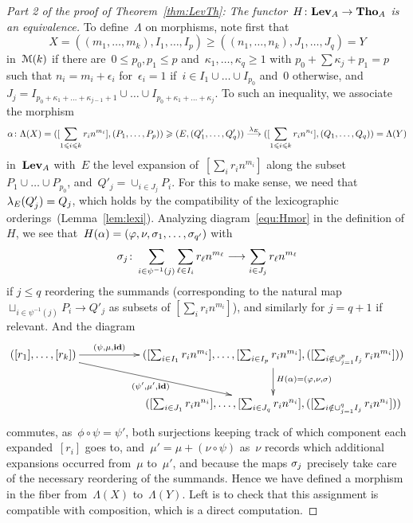 \begin{proof}[Part 2 of the proof of Theorem~\ref{thm:LevTh}: The functor~$H\colon\mathbf{Lev}_A\to \mathbf{Tho}_A$ is an equivalence]
To define~$\Lambda$ on morphisms, note first that 
\[
X=((m_1,\dots,m_k),I_1,\dots,I_p)\ge ((n_1,\dots,n_k),J_1,\dots,J_q)=Y
\]
in~$\mathcal{M}(k)$ if there are~$0\le p_0,p_1\le p$ and~$\kappa_1,\dots,\kappa_q\ge 1$ with 
$p_0+\sum \kappa_j+p_1=p$ such that  
$n_i=m_i+\epsilon_i$ for~$\epsilon_i=1$ if~$i\in I_1\cup\dots\cup I_{p_0}$ and~$0$ otherwise, and~$J_j=I_{p_0+\kappa_1+\dots+\kappa_{j-1}+1}\cup\dots\cup I_{p_0+\kappa_1+\dots+\kappa_{j}}$. 
To such an inequality, we associate the morphism 
$$\alpha\colon\Lambda(X)=([\sum_{1\leqslant i\leqslant k}r_in^{m_i}],(P_1,\dots,P_p)) \geqslant (E,(Q_1',\dots,Q_q')) \stackrel{\lambda_E}{\longrightarrow} ([\sum_{1\leqslant i\leqslant k}r_in^{n_i}],(Q_1,\dots,Q_q))=\Lambda(Y)$$
 in~$\mathbf{Lev}_A$ with~$E$ the level expansion of~$[\sum_ir_in^{m_i}]$ along the subset~$P_1\cup\dots\cup P_{p_0}$, and~$Q'_j=\cup_{i\in J_j}P_i$. 
For this to make sense, we need that $\lambda_E(Q'_j)=Q_j$, which holds by the compatibility of the lexicographic orderings~(Lemma~\ref{lem:lexi}). 
Analyzing diagram~\eqref{equ:Hmor} in the definition of $H$, we see that~\hbox{$H(\alpha)=(\varphi,\nu,\sigma_1,\dots,\sigma_{q'})$} with 
$$\sigma_j\colon \sum_{i\in \psi^{-1}(j)}\sum_{\ell\in I_i}r_\ell n^{m_\ell} \longrightarrow  \sum_{i\in J_j}r_\ell n^{m_\ell}$$
if $j\le q$ reordering the summands (corresponding to the natural map $\sqcup_{i\in \psi^{-1}(j)}P_i\to Q'_j$ as subsets of $[\sum_ir_in^{m_i}]$), and similarly for $j=q+1$ if relevant. And the diagram 
$$\xymatrix{([r_1],\dots,[r_k])\ar[rr]^-{(\psi,\mu,\bid)} \ar[drr]_-{(\psi',\mu',\bid)} &&  ([\sum_{i\in I_1}r_in^{m_i}],\dots,[\sum_{i\in I_p}r_in^{m_i}],([\sum_{i\notin\cup_{j=1}^p I_j}r_in^{m_i}])) \ar[d]^{H(\alpha)=(\phi,\nu,{\bf\s})} \\
&&  ([\sum_{i\in J_1}r_in^{n_i}],\dots,[\sum_{i\in J_q}r_in^{n_i}],([\sum_{i\notin\cup_{j=1}^q I_j}r_in^{n_i}]))}$$
commutes, as~$\phi\circ\psi=\psi'$, both surjections keeping track of which component each expanded~$[r_i]$ goes to,  and~$\mu'=\mu+(\nu\circ\psi)$ as~$\nu$ records which additional expansions occurred from~$\mu$ to~$\mu'$, and because the maps $\sigma_j$ precisely take care of the necessary reordering of the summands.  
Hence we have defined a morphism in the fiber from~$\Lambda(X)$ to~$\Lambda(Y)$. Left is to check that this assignment is compatible with composition, which is a direct computation. 




\end{proof}
